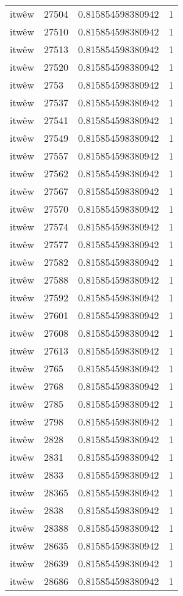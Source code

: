 \begin{longtable}{llll}
itwêw & 27504 & 0.815854598380942 & 1 \\
itwêw & 27510 & 0.815854598380942 & 1 \\
itwêw & 27513 & 0.815854598380942 & 1 \\
itwêw & 27520 & 0.815854598380942 & 1 \\
itwêw & 2753 & 0.815854598380942 & 1 \\
itwêw & 27537 & 0.815854598380942 & 1 \\
itwêw & 27541 & 0.815854598380942 & 1 \\
itwêw & 27549 & 0.815854598380942 & 1 \\
itwêw & 27557 & 0.815854598380942 & 1 \\
itwêw & 27562 & 0.815854598380942 & 1 \\
itwêw & 27567 & 0.815854598380942 & 1 \\
itwêw & 27570 & 0.815854598380942 & 1 \\
itwêw & 27574 & 0.815854598380942 & 1 \\
itwêw & 27577 & 0.815854598380942 & 1 \\
itwêw & 27582 & 0.815854598380942 & 1 \\
itwêw & 27588 & 0.815854598380942 & 1 \\
itwêw & 27592 & 0.815854598380942 & 1 \\
itwêw & 27601 & 0.815854598380942 & 1 \\
itwêw & 27608 & 0.815854598380942 & 1 \\
itwêw & 27613 & 0.815854598380942 & 1 \\
itwêw & 2765 & 0.815854598380942 & 1 \\
itwêw & 2768 & 0.815854598380942 & 1 \\
itwêw & 2785 & 0.815854598380942 & 1 \\
itwêw & 2798 & 0.815854598380942 & 1 \\
itwêw & 2828 & 0.815854598380942 & 1 \\
itwêw & 2831 & 0.815854598380942 & 1 \\
itwêw & 2833 & 0.815854598380942 & 1 \\
itwêw & 28365 & 0.815854598380942 & 1 \\
itwêw & 2838 & 0.815854598380942 & 1 \\
itwêw & 28388 & 0.815854598380942 & 1 \\
itwêw & 28635 & 0.815854598380942 & 1 \\
itwêw & 28639 & 0.815854598380942 & 1 \\
itwêw & 28686 & 0.815854598380942 & 1 \\

\end{longtable}

